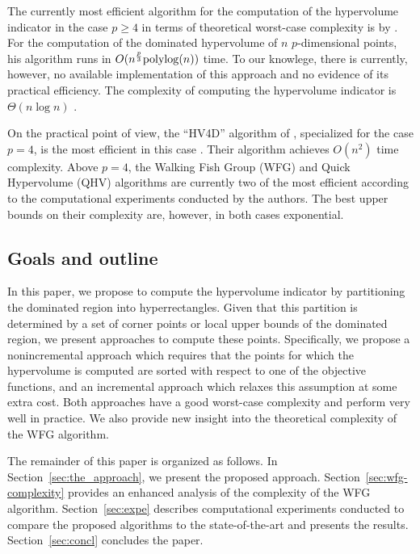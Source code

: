 \documentclass[a4paper,11pt]{article}
\begin{document}
The currently most efficient algorithm for the computation of the hypervolume indicator in the case $p\geq 4$
in terms of theoretical worst-case complexity 
is by \citet{Cha13}.
For the computation of the dominated hypervolume of $n$ $p$-dimensional points,
his algorithm runs in $O(n^{\frac{p}{3}}{\rm polylog}(n))$ time. 
To our knowlege, there is currently, however, no available implementation of this approach
and no evidence of its practical efficiency.
The complexity of computing the hypervolume indicator is $\Theta(n\log n)$
\citep[see][]{BeuFonLopPaqVah09}.

On the practical point of view, the ``HV4D'' algorithm of \citet{GueFonEmm12},
specialized for the case $p = 4$, 
is the most efficient in this case 
\citep[see e.g. the computational results of][]{RusFra14, NowMaeIzz14}.
Their algorithm achieves $O(n^2)$ time complexity.
Above $p = 4$, the Walking Fish Group (WFG) \citep{WhiBraBar12} 
and Quick Hypervolume (QHV) \citep{RusFra14} algorithms are currently
two of the most efficient according to the computational experiments 
conducted by the authors.
The best upper bounds on their complexity are, however, in both cases exponential.


\subsection{Goals and outline}

In this paper, we propose to compute the hypervolume indicator
by partitioning the dominated region into hyperrectangles. 
Given that this partition is determined by a set of corner points or local upper bounds of the dominated region,
we present approaches to compute these points.
Specifically, we propose a nonincremental approach
which requires that the points for which the hypervolume is computed
are sorted with respect to one of the objective functions,
and an incremental approach which relaxes this assumption
at some extra cost.
Both approaches have a good worst-case complexity and perform very well in practice.
We also provide new insight into the theoretical complexity of the WFG algorithm.

The remainder of this paper is organized as follows.
In Section~\ref{sec:the_approach}, we present the proposed approach.
Section~\ref{sec:wfg-complexity} provides an enhanced analysis
of the complexity of the WFG algorithm.
Section~\ref{sec:expe} describes computational experiments 
conducted to compare the proposed algorithms to the state-of-the-art and presents the results.
Section~\ref{sec:concl} concludes the paper.
\end{document}
